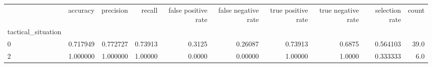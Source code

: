 \begin{tabular}{lrrrrrrrrr}
\toprule
{} &  accuracy &  precision &   recall &  false positive rate &  false negative rate &  true positive rate &  true negative rate &  selection rate &  count \\
tactical\_situation &           &            &          &                      &                      &                     &                     &                 &        \\
\midrule
0                  &  0.717949 &   0.772727 &  0.73913 &               0.3125 &              0.26087 &             0.73913 &              0.6875 &        0.564103 &   39.0 \\
2                  &  1.000000 &   1.000000 &  1.00000 &               0.0000 &              0.00000 &             1.00000 &              1.0000 &        0.333333 &    6.0 \\
\bottomrule
\end{tabular}
